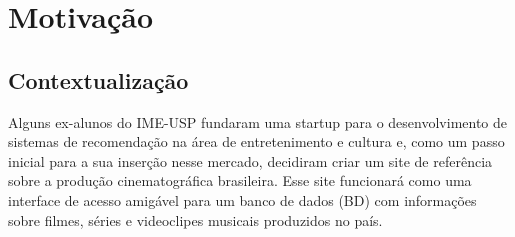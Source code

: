\documentclass[
	12pt,				%
	openright,			%
	oneside,			%
	a4paper,			%
	english,			%
	french,				%
	spanish,			%
	brazil,				%
	]{abntex2}
\begin{document}








\chapter{Motivação}

\section{Contextualização}

Alguns ex-alunos do IME-USP fundaram uma startup para o desenvolvimento de sistemas de recomendação na área de entretenimento e cultura e, como um passo inicial para a sua inserção nesse mercado, decidiram criar um site de referência sobre a produção cinematográfica brasileira. Esse site funcionará como uma interface de acesso amigável para um banco de dados (BD) com informações sobre filmes, séries e videoclipes musicais produzidos no país.
\end{document}
